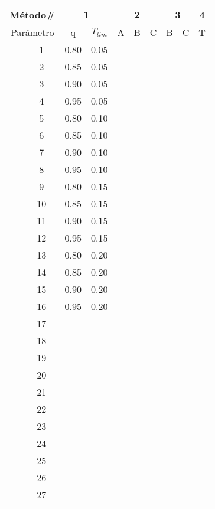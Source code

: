 \begin{table}[htb]
{
	\begin{tabular}{cc|cc|ccc|cc|c}
		\toprule
		\multicolumn{2}{c}{Método\#} & \multicolumn{2}{c}{1} & \multicolumn{3}{c}{2} & \multicolumn{2}{c}{3} & 4\\
		\midrule
		\multicolumn{2}{c}{Parâmetro}	&q&$T_{lim}$&A&B&C&B&C&T \\
		\midrule \midrule					
		\multirow{27}{*}{\rotatebox{90}{Índice da Combinação}} &
		1 &0.80&0.05&&&&&\\
		&2 &0.85&0.05&&&&&\\
		&3 &0.90&0.05&&&&&\\
		&4 &0.95&0.05&&&&&\\
		&5 &0.80&0.10&&&&&\\
		&6 &0.85&0.10&&&&&\\
		&7 &0.90&0.10&&&&&\\
		&8 &0.95&0.10&&&&&\\
		&9 &0.80&0.15&&&&&\\
		&10&0.85&0.15&&&&&\\
		&11&0.90&0.15&&&&&\\
		&12&0.95&0.15&&&&&\\
		&13&0.80&0.20&&&&&\\
		&14&0.85&0.20&&&&&\\
		&15&0.90&0.20&&&&&\\
		&16&0.95&0.20&&&&&\\
		&17&\-  &\-  &&&&&\\
		&18&\-  &\-  &&&&&\\
		&19&\-  &\-  &&&&&\\
		&20&\-  &\-  &&&&&\\
		&21&\-  &\-  &&&&&\\
		&22&\-  &\-  &&&&&\\
		&23&\-  &\-  &&&&&\\
		&24&\-  &\-  &&&&&\\
		&25&\-  &\-  &&&&&\\
		&26&\-  &\-  &&&&&\\
		&27&\-  &\-  &&&&&\\
		\bottomrule
	\end{tabular}
}{}
\end{table}
